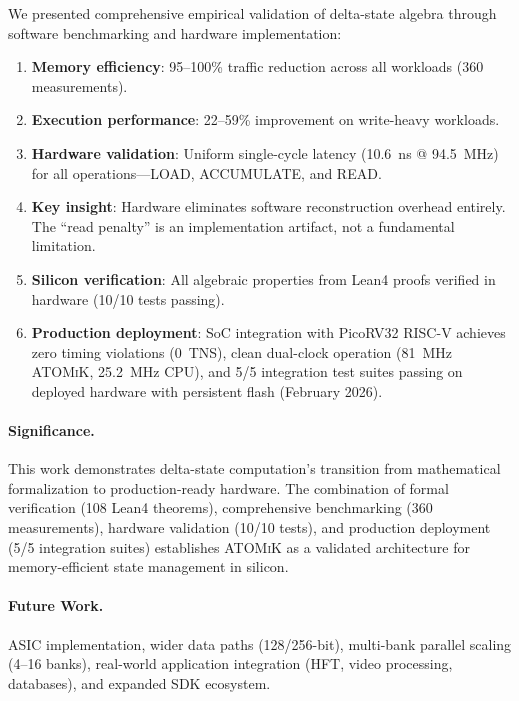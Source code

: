 \documentclass[11pt,letterpaper]{article}
\theoremstyle{plain}
\theoremstyle{definition}
\theoremstyle{remark}
\newcommand{\atomik}{\textsc{ATOMiK}}
\begin{document}
We presented comprehensive empirical validation of delta-state algebra through software benchmarking and hardware implementation:

\begin{enumerate}
    \item \textbf{Memory efficiency}: 95--100\% traffic reduction across all workloads (360 measurements).

    \item \textbf{Execution performance}: 22--59\% improvement on write-heavy workloads.

    \item \textbf{Hardware validation}: Uniform single-cycle latency (10.6~ns @ 94.5~MHz) for all operations---LOAD, ACCUMULATE, and READ.

    \item \textbf{Key insight}: Hardware eliminates software reconstruction overhead entirely. The ``read penalty'' is an implementation artifact, not a fundamental limitation.

    \item \textbf{Silicon verification}: All algebraic properties from Lean4 proofs verified in hardware (10/10 tests passing).

    \item \textbf{Production deployment}: SoC integration with PicoRV32 RISC-V achieves zero timing violations (0~TNS), clean dual-clock operation (81~MHz \atomik{}, 25.2~MHz CPU), and 5/5 integration test suites passing on deployed hardware with persistent flash (February 2026).
\end{enumerate}

\paragraph{Significance.} This work demonstrates delta-state computation's transition from mathematical formalization to production-ready hardware. The combination of formal verification (108 Lean4 theorems), comprehensive benchmarking (360 measurements), hardware validation (10/10 tests), and production deployment (5/5 integration suites) establishes \atomik{} as a validated architecture for memory-efficient state management in silicon.

\paragraph{Future Work.} ASIC implementation, wider data paths (128/256-bit), multi-bank parallel scaling (4--16 banks), real-world application integration (HFT, video processing, databases), and expanded SDK ecosystem.
\end{document}

